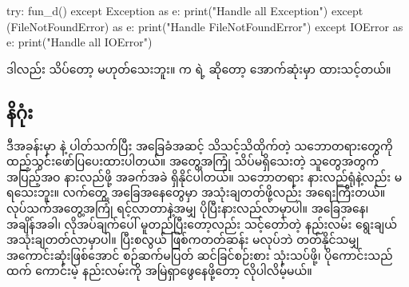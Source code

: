 %
\begin{py}
try:
    fun_d()
except Exception as e:
    print("Handle all Exception")
except (FileNotFoundError) as e:
    print("Handle FileNotFoundError")
except IOError as e:
    print("Handle all IOError")
\end{py}
%
ဒါလည်း သိပ်တော့ မဟုတ်သေးဘူး။  က  ရဲ့  ဆိုတော့ အောက်ဆုံးမှာ ထားသင့်တယ်။


\subsection*{နိဂုံး}
ဒီအခန်းမှာ  နဲ့ ပါတ်သက်ပြီး အခြေခံအဆင့် သိသင့်သိထိုက်တဲ့ သဘောတရားတွေကို ထည့်\allowbreak သွင်းဖော်ပြပေးထားပါတယ်။ အတွေ့အကြုံ သိပ်မရှိသေးတဲ့ သူတွေအတွက် အပြည့်အဝ နားလည်ဖို့ အခက်အခဲ ရှိနိုင်ပါတယ်။ သဘောတရား နားလည်ရုံနဲ့လည်း မရသေးဘူး။ လက်တွေ့ အခြေအ\allowbreak နေတွေမှာ အသုံးချတတ်ဖို့လည်း အရေးကြီးတယ်။ လုပ်သက်အတွေ့အကြုံ ရင့်လာတာနဲ့အမျှ ပိုပြီးနား\allowbreak လည်လာမှာပါ။ အခြေအနေ၊ အချိန်အခါ၊ လိုအပ်ချက်ပေါ် မူတည်ပြီးတော့လည်း သင့်တော်တဲ့ နည်းလမ်း ရွေးချယ် အသုံးချတတ်လာမှာပါ။ ပြီးစ\allowbreak လွယ် ဖြစ်ကတတ်ဆန်း မလုပ်ဘဲ တတ်နိုင်သမျှ အကောင်းဆုံးဖြစ်အောင် စဉ်ဆက်မပြတ် ဆင်ခြင်စဉ်းစား သုံးသပ်ဖို့၊ ပိုကောင်းသည်ထက် ကောင်းမဲ့ နည်းလမ်းကို အမြဲရှာဖွေနေဖို့တော့ လိုပါလိမ့်မယ်။

\clearpage




